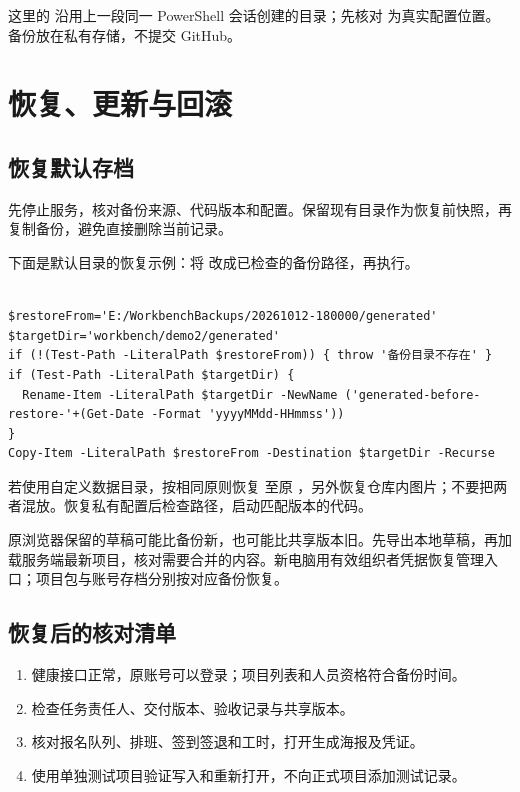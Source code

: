\documentclass[UTF8,fontset=windows,zihao=-4,a4paper]{ctexart}
\begin{document}
这里的  沿用上一段同一 PowerShell 会话创建的目录；先核对  为真实配置位置。备份放在私有存储，不提交 GitHub。


\section{恢复、更新与回滚}\label{sec:5}

\subsection*{恢复默认存档}

先停止服务，核对备份来源、代码版本和配置。保留现有目录作为恢复前快照，再复制备份，避免直接删除当前记录。


下面是默认目录的恢复示例：将  改成已检查的备份路径，再执行。



\begin{Verbatim}[fontsize=\small,breaklines=true,breakanywhere=true,frame=single,rulecolor=\color{Rule},framesep=7pt]

$restoreFrom='E:/WorkbenchBackups/20261012-180000/generated'
$targetDir='workbench/demo2/generated'
if (!(Test-Path -LiteralPath $restoreFrom)) { throw '备份目录不存在' }
if (Test-Path -LiteralPath $targetDir) {
  Rename-Item -LiteralPath $targetDir -NewName ('generated-before-restore-'+(Get-Date -Format 'yyyyMMdd-HHmmss'))
}
Copy-Item -LiteralPath $restoreFrom -Destination $targetDir -Recurse

\end{Verbatim}

若使用自定义数据目录，按相同原则恢复  至原 ，另外恢复仓库内图片；不要把两者混放。恢复私有配置后检查路径，启动匹配版本的代码。


原浏览器保留的草稿可能比备份新，也可能比共享版本旧。先导出本地草稿，再加载服务端最新项目，核对需要合并的内容。新电脑用有效组织者凭据恢复管理入口；项目包与账号存档分别按对应备份恢复。


\subsection*{恢复后的核对清单}

\begin{enumerate}[start=1]

\item 健康接口正常，原账号可以登录；项目列表和人员资格符合备份时间。

\item 检查任务责任人、交付版本、验收记录与共享版本。

\item 核对报名队列、排班、签到签退和工时，打开生成海报及凭证。

\item 使用单独测试项目验证写入和重新打开，不向正式项目添加测试记录。

\end{enumerate}
\end{document}
